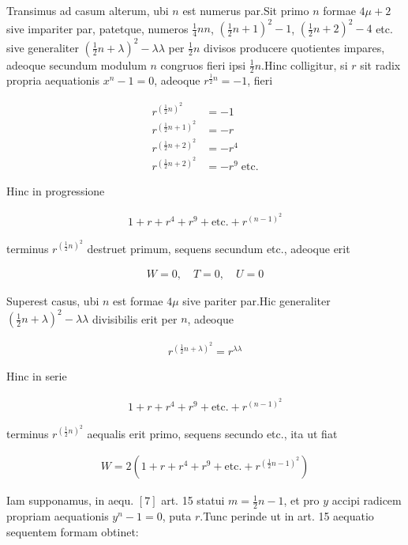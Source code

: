 

Transimus ad casum alterum, ubi $n$ est numerus par.\quad Sit primo $n$ formae $4\mu+2$ sive impariter par, patetque, numeros $\frac14nn$, $(\frac12n+1)^2-1$, $(\frac12n+2)^2-4$ etc. sive generaliter $(\frac12n+\lambda)^2-\lambda\lambda$ per $\frac12n$ divisos producere quotientes impares, adeoque secundum modulum $n$ congruos fieri ipsi $\frac12n$.\quad Hinc colligitur, si $r$ sit radix propria aequationis $x^n-1=0$, adeoque $r^{\frac12n}=-1$, fieri

\[
\begin{aligned}
r^{(\frac12n)^2}&=-1\\
r^{(\frac12n+1)^2}&=-r\\
r^{(\frac12n+2)^2}&=-r^4\\
r^{(\frac12n+2)^2}&=-r^9\;\text{etc.}
\end{aligned}
\]

Hinc in progressione

\[
\begin{aligned}
1+r+r^4+r^9+\text{etc.}+r^{(n-1)^2}
\end{aligned}
\]

terminus $r^{(\frac12n)^2}$ destruet primum, sequens secundum etc., adeoque erit

\[
\begin{aligned}
W=0,\quad T=0,\quad U=0
\end{aligned}
\]


Superest casus, ubi $n$ est formae $4\mu$ sive pariter par.\quad Hic generaliter $(\frac12n+\lambda)^2-\lambda\lambda$ divisibilis erit per $n$, adeoque

\[
\begin{aligned}
r^{(\frac12n+\lambda)^2}=r^{\lambda\lambda}
\end{aligned}
\]

Hinc in serie

\[
\begin{aligned}
1+r+r^4+r^9+\text{etc.}+r^{(n-1)^2}
\end{aligned}
\]

terminus $r^{(\frac12n)^2}$ aequalis erit primo, sequens secundo etc., ita ut fiat

\[
\begin{aligned}
W=2(1+r+r^4+r^9+\text{etc.}+r^{(\frac12n-1)^2})
\end{aligned}
\]

Iam supponamus, in aequ. $[7]$ art. 15 statui $m=\frac12n-1$, et pro $y$ accipi radicem propriam aequationis $y^n-1=0$, puta $r$.\quad Tunc perinde ut in art. 15 aequatio sequentem formam obtinet:

